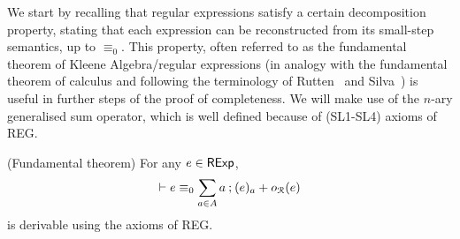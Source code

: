 We start by recalling that regular expressions satisfy a certain decomposition property, stating that each expression can be reconstructed from its small-step semantics, up to $\equiv_0$. This property, often referred to as the fundamental theorem of Kleene Algebra/regular expressions (in analogy with the fundamental theorem of calculus and following the terminology of Rutten~\cite{Rutten:2000:Universal} and Silva~\cite{Silva:2010:Kleene}) is useful in further steps of the proof of completeness. We will make use of the $n$-ary generalised sum operator, which is well defined because of \textsf{(SL1-SL4)} axioms of \textsf{REG}.
\begin{theorem}{(Fundamental theorem)}\label{c2:thm:fundamental_theorem}
    For any $e \in \mathsf{RExp}$, $$
    \vdash e \equiv_0 \sum_{a \in {A}} a \mathbin{;} (e)_a + o_{\mathcal{R}}(e)
    $$ is derivable using the axioms of \textsf{REG}.
\end{theorem}
